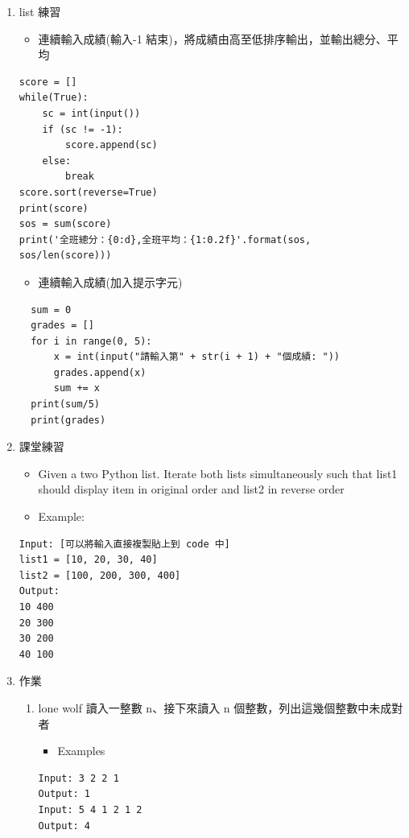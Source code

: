 \documentclass[a4paper,12pt]{article}
\begin{document}
\begin{enumerate}
\begin{enumerate}
\begin{lstlisting}
# 使用 zip 同時迭代多個 List
for x, y, z in zip(names, values, ages):
  print(x, y, z)
\end{lstlisting}
\end{enumerate}

\item list 練習
\label{sec:org49aec69}
\begin{itemize}
\item 連續輸入成績(輸入-1 結束)，將成績由高至低排序輸出，並輸出總分、平均\\
\end{itemize}
\lstset{breaklines=true,language=Python,label=分數排序,caption= ,captionpos=b,firstnumber=1,numbers=left}
\begin{lstlisting}
score = []
while(True):
    sc = int(input())
    if (sc != -1):
        score.append(sc)
    else:
        break
score.sort(reverse=True)
print(score)
sos = sum(score)
print('全班總分：{0:d},全班平均：{1:0.2f}'.format(sos, sos/len(score)))
\end{lstlisting}
\begin{itemize}
\item 連續輸入成績(加入提示字元)\\
\end{itemize}
\lstset{breaklines=true,language=Python,label=計算機,caption= ,captionpos=b,firstnumber=1,numbers=left}
\begin{lstlisting}
  sum = 0
  grades = []
  for i in range(0, 5):
      x = int(input("請輸入第" + str(i + 1) + "個成績: "))
      grades.append(x)
      sum += x
  print(sum/5)
  print(grades)
\end{lstlisting}

\item 課堂練習
\label{sec:orgb9f9cb9}
\begin{itemize}
\item Given a two Python list. Iterate both lists simultaneously such that list1 should display item in original order and list2 in reverse order\\
\item Example:\\
\end{itemize}
\begin{verbatim}
Input: [可以將輸入直接複製貼上到 code 中]
list1 = [10, 20, 30, 40]
list2 = [100, 200, 300, 400]
Output:
10 400
20 300
30 200
40 100
\end{verbatim}

\item 作業
\label{sec:orgd7b6861}
\begin{enumerate}
\item lone wolf
\label{sec:org1099476}
讀入一整數 n、接下來讀入 n 個整數，列出這幾個整數中未成對者\\
\begin{itemize}
\item Examples\\
\end{itemize}
\begin{verbatim}
Input: 3 2 2 1
Output: 1
Input: 5 4 1 2 1 2
Output: 4
\end{verbatim}



\end{enumerate}
\end{enumerate}
\end{document}
